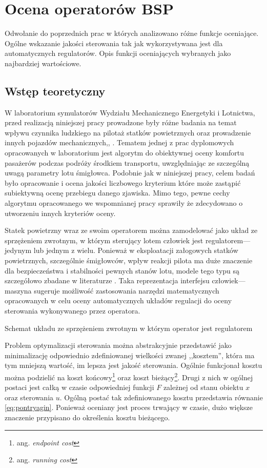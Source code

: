 \newpage
\section{Ocena operatorów BSP}
\begin{todo}
    Odwołanie do poprzednich prac w których analizowano różne funkcje oceniające. Ogólne wskazanie jakości sterowania tak jak wykorzystywana jest dla automatycznych regulatorów. Opis funkcji oceniających wybranych jako najbardziej wartościowe.
\end{todo}

\subsection{Wstęp teoretyczny}
\label{sec:ocena-teoria}
W laboratorium symulatorów Wydziału Mechanicznego Energetyki i Lotnictwa, przed realizacją niniejszej pracy prowadzone były różne badania na temat wpływu czynnika ludzkiego na pilotaż statków powietrznych oraz prowadzenie innych pojazdów mechanicznych\cite{kopyt2017},\cite{kopyt2019}, . Tematem jednej z prac dyplomowych opracowanych w laboratorium\cite{tomaszewska2019} jest algorytm do obiektywnej oceny komfortu pasażerów podczas podróży środkiem transportu, uwzględniając ze szczególną uwagą parametry lotu śmigłowca. Podobnie jak w niniejszej pracy, celem badań było opracowanie i ocena jakości liczbowego kryterium które może zastąpić subiektywną ocenę przebiegu danego zjawiska. Mimo tego, pewne cechy algorytmu opracowanego we wspomnianej pracy sprawiły że zdecydowano o utworzeniu innych kryteriów oceny.

Statek powietrzny wraz ze swoim operatorem można zamodelować jako układ ze sprzężeniem zwrotnym, w którym sterujący lotem człowiek jest regulatorem---jedynym lub jednym z wielu. Ponieważ w eksploatacji załogowych statków powietrznych, szczególnie śmigłowców, wpływ reakcji pilota ma duże znaczenie dla bezpieczeństwa i stabilności pewnych stanów lotu, modele tego typu są szczegółowo zbadane w literaturze \cite{roskam1998}. Taka reprezentacja interfejsu człowiek---maszyna sugeruje możliwość zastosowania narzędzi matematycznych opracowanych w celu oceny automatycznych układów regulacji do oceny sterowania wykonywanego przez operatora.

\begin{todo}
    Schemat układu ze sprzężeniem  zwrotnym w którym operator jest regulatorem
\end{todo}

Problem optymalizacji sterowania można abstrakcyjnie przedstawić jako minimalizację odpowiednio zdefiniowanej wielkości zwanej ,,kosztem'', która ma tym mniejszą wartość, im lepsza jest jakość sterowania. Ogólnie funkcjonał kosztu można podzielić na koszt końcowy\footnote{ang. \emph{endpoint cost}} oraz koszt bieżący\footnote{ang. \emph{running cost}}\cite{ross2009}. Drugi z nich w ogólnej postaci jest całką w czasie odpowiedniej funkcji $ F $ zależnej od stanu obiektu $ x $ oraz sterowania $ u $. Ogólną postać tak zdefiniowanego kosztu przedstawia równanie \ref{eq:pontryagin}. Ponieważ oceniany jest proces trwający w czasie, dużo większe znaczenie przypisano do określenia kosztu bieżącego.

